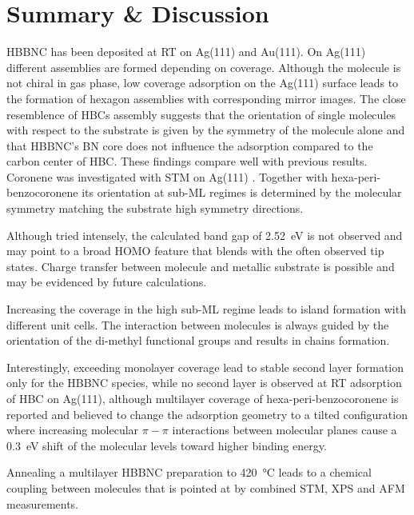 \section{Summary \& Discussion}

HBBNC has been deposited at RT on Ag(111) and Au(111). On Ag(111) different assemblies are formed depending on coverage. Although the molecule is not chiral in gas phase, low coverage adsorption on the Ag(111) surface leads to the formation of hexagon assemblies with corresponding mirror images. The close resemblence of HBCs assembly suggests that the orientation of single molecules with respect to the substrate is given by the symmetry of the molecule alone and that HBBNC's BN core does not influence the adsorption compared to the carbon center of HBC. These findings compare well with previous results. Coronene was investigated with STM on Ag(111) \cite{lackinger_coronene_2002, mckinnon_observation_1995}. Together with hexa-peri-benzocoronene its orientation at sub-ML regimes is determined by the molecular symmetry matching the substrate high symmetry directions\cite{zimmermann_epitaxial_1992}.

Although tried intensely, the calculated band gap of \SI{2.52}{\eV} is not observed and may point to a broad HOMO feature that blends with the often observed tip states.
Charge transfer between molecule and metallic substrate is possible and may be evidenced by future calculations.

Increasing the coverage in the high sub-ML regime leads to island formation with different unit cells. The interaction between molecules is always guided by the orientation of the di-methyl functional groups and results in chains formation.

Interestingly, exceeding monolayer coverage lead to stable second layer formation only for the HBBNC species, while no second layer is observed at RT adsorption of HBC on Ag(111), although multilayer coverage of hexa-peri-benzocoronene is reported and believed to change the adsorption geometry to a tilted configuration\cite{zimmermann_epitaxial_1992} where increasing molecular $\pi-\pi$ interactions between molecular planes cause a \SI{0,3}{\eV} shift of the molecular levels toward higher binding energy\cite{glowatzki_hexa-_2008}.

Annealing a multilayer HBBNC preparation to \SI{420}{\celsius} leads to a chemical coupling between molecules that is pointed at by combined STM, XPS and AFM measurements. 
